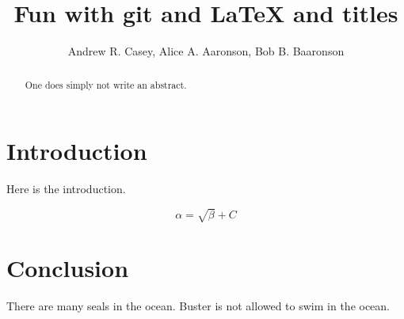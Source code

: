 \documentclass{article}
\begin{document}
\title{Fun with git and \LaTeX{ and titles}}
\author{Andrew R. Casey, Alice A. Aaronson, Bob B. Baaronson}

\maketitle

\begin{abstract}
One does simply not write an abstract.
\end{abstract}

\section{Introduction}
Here is the introduction.

\begin{equation}
    \label{simple_equation}
    \alpha = \sqrt{ \beta } + C
\end{equation}


\section{Conclusion}
There are many seals in the ocean. Buster is not allowed to swim in the ocean.
\end{document}
